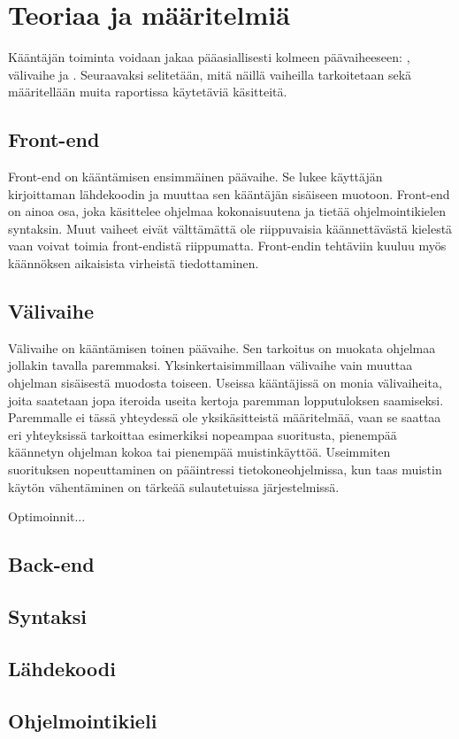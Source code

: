 
\section{Teoriaa ja määritelmiä}
Kääntäjän toiminta voidaan jakaa pääasiallisesti kolmeen päävaiheeseen:
, välivaihe ja .
Seuraavaksi selitetään, mitä näillä vaiheilla tarkoitetaan
sekä määritellään muita raportissa käytetäviä käsitteitä.


\subsection{Front-end}
Front-end on kääntämisen ensimmäinen päävaihe.
Se lukee käyttäjän kirjoittaman lähdekoodin
ja muuttaa sen kääntäjän sisäiseen muotoon.
Front-end on ainoa osa, joka käsittelee ohjelmaa kokonaisuutena
ja tietää ohjelmointikielen syntaksin.
Muut vaiheet eivät välttämättä ole riippuvaisia käännettävästä
kielestä vaan voivat toimia front-endistä riippumatta.
Front-endin tehtäviin kuuluu myös käännöksen aikaisista virheistä tiedottaminen.

\subsection{Välivaihe}
Välivaihe on kääntämisen toinen päävaihe.
Sen tarkoitus on muokata ohjelmaa jollakin tavalla paremmaksi.
Yksinkertaisimmillaan välivaihe vain muuttaa ohjelman sisäisestä
muodosta toiseen.
Useissa kääntäjissä on monia välivaiheita, joita saatetaan jopa
iteroida useita kertoja paremman lopputuloksen saamiseksi.
Paremmalle ei tässä yhteydessä ole yksikäsitteistä määritelmää,
vaan se saattaa eri yhteyksissä tarkoittaa esimerkiksi
nopeampaa suoritusta, pienempää käännetyn ohjelman kokoa
tai pienempää muistinkäyttöä. Useimmiten suorituksen nopeuttaminen
on pääintressi tietokoneohjelmissa, kun taas muistin käytön
vähentäminen on tärkeää sulautetuissa järjestelmissä.

Optimoinnit...

\subsection{Back-end}
\subsection{Syntaksi}
\subsection{Lähdekoodi}
\subsection{Ohjelmointikieli}